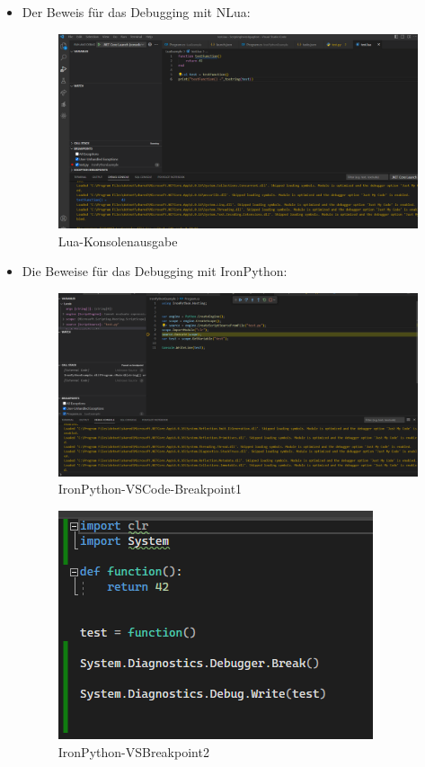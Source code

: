 \begin{itemize}
    \item Der Beweis für das Debugging mit NLua:
    
    \begin{figure}[H]
        \centering
        \includegraphics[scale=0.5]{pics/Lua-Konsolenausgabe.png}
        \caption{Lua-Konsolenausgabe}
        \label{fig:impl:KonsolenausgabeLua}
    \end{figure}

\newpage
    \item Die Beweise für das Debugging mit IronPython:
    \begin{figure}[H]
        \centering
        \includegraphics[scale=0.5]{pics/IronPythonVSCodeBreakpoint1.png}
        \caption{IronPython-VSCode-Breakpoint1}
        \label{fig:impl:IronPythonVSCodeBreakpoint1}
    \end{figure}

    \begin{figure}[H]
        \centering
        \includegraphics{pics/IronPythonVSBreakpoint2.png}
        \caption{IronPython-VSBreakpoint2}
        \label{fig:impl:IronPythonVSBreakpoint2}
    \end{figure}


\end{itemize}
